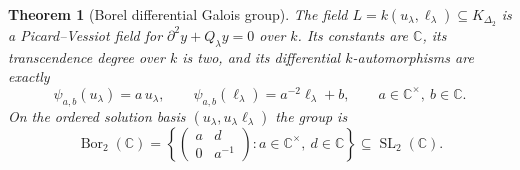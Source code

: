 \documentclass[11pt,letterpaper]{article}
\numberwithin{equation}{section}
\newtheorem{theorem}{Theorem}[section]
\theoremstyle{definition}
\theoremstyle{remark}
\newcommand{\C}{\mathbb C}
\newcommand{\der}{\partial}
\newcommand{\SL}{\operatorname{SL}}
\newcommand{\Bor}{\operatorname{Bor}}
\begin{document}
\begin{theorem}[Borel differential Galois group]
\label{diff:cp:thm:pv}
The field $L=k(u_{\lambda},\ell_{\lambda})\subseteq K_{\Delta_{2}}$ is a
Picard--Vessiot field for $\der^{2}y+Q_{\lambda}y=0$ over $k$. Its constants are
$\C$, its transcendence degree over $k$ is two, and its differential
$k$-automorphisms are exactly
\begin{equation}\label{diff:cp:eq:pvaction}
 \psi_{a,b}(u_{\lambda})=a\,u_{\lambda},\qquad
 \psi_{a,b}(\ell_{\lambda})=a^{-2}\ell_{\lambda}+b,
 \qquad a\in\C^{\times},\ b\in\C .
\end{equation}
On the ordered solution basis $(u_{\lambda},u_{\lambda}\ell_{\lambda})$ the group
is
\begin{equation}\label{diff:cp:eq:borel}
 \Bor_{2}(\C)=\left\{\begin{pmatrix}a&d\\0&a^{-1}\end{pmatrix}:
 a\in\C^{\times},\ d\in\C\right\}\subseteq\SL_{2}(\C).
\end{equation}
\end{theorem}
\end{document}
